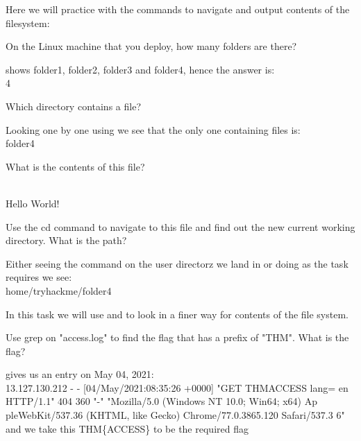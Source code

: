 \begin{task}
Here we will practice with the commands to navigate and output contents of the filesystem:\\

\begin{question}
On the Linux machine that you deploy, how many folders are there?
\end{question}
\begin{answer}
 shows folder1, folder2, folder3 and folder4, hence the answer is: \\
4
\end{answer}

\begin{question}
Which directory contains a file?
\end{question}
\begin{answer}
Looking one by one using  we see that the only one containing files is:\\
folder4
\end{answer}

\begin{question}
What is the contents of this file?
\end{question}
\begin{answer}
\\
Hello World!
\end{answer}
\begin{question}
Use the cd command to navigate to this file and find out the new current working directory. What is the path?
\end{question}
\begin{answer}
Either seeing the  command on the user directorz we land in or doing as the task requires we see:\\
home/tryhackme/folder4
\end{answer}
\end{task}

\begin{task}
In this task we will use  and  to look in a finer way for contents of the file system. 

\begin{question}
Use grep on "access.log" to find the flag that has a prefix of "THM". What is the flag?
\end{question}
\begin{answer}
 gives us an entry on May 04, 2021: \\
13.127.130.212 - - [04/May/2021:08:35:26 +0000] "GET THM{ACCESS} lang=
en HTTP/1.1" 404 360 "-" "Mozilla/5.0 (Windows NT 10.0; Win64; x64) Ap
pleWebKit/537.36 (KHTML, like Gecko) Chrome/77.0.3865.120 Safari/537.3
6" \\
and we take this THM\{ACCESS\} to be the required flag
\end{answer}
\end{task}

